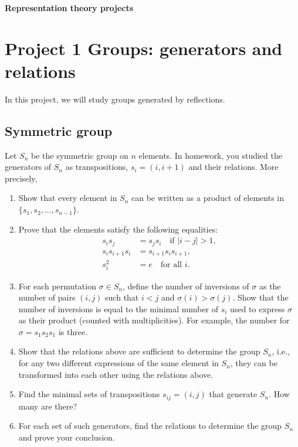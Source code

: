 \documentclass[12pt]{article}
\theoremstyle{definition}
\theoremstyle{remark}
\begin{document}
\centerline{\bf\large Representation theory projects}
\centerline{}








\section{Project 1 Groups: generators and relations}
In this project, we will study groups generated by reflections. 

\subsection{Symmetric group}
Let $S_n$ be the symmetric group on $n$ elements. In homework, you studied the generators of $S_n$ as transpositions, $s_i=(i,i+1)$ and their relations. More precisely, 
\begin{enumerate}
  \item Show that every element in $S_n$ can be written as a product of elements in $\{s_1, s_2, \ldots, s_{n-1}\}$.
  \item Prove that the elements satisfy the following equalities:
  \begin{align*}  
    s_i s_j &= s_j s_i \quad \text{if } |i - j| > 1, \\
    s_i s_{i+1} s_i&= s_{i+1} s_i s_{i+1}, \\
    s_i^2 &= e \quad \text{for all } i.
  \end{align*}

  \item For each permutation $\sigma\in S_n$, define the number of inversions of $\sigma$ as the number of pairs $(i,j)$ such that $i<j$ and $\sigma(i)>\sigma(j)$. Show that the number of inversions is equal to the minimal number of $s_i$ used to express $\sigma$ as their product (counted with multiplicities). For example, the number for $\sigma=s_1s_2s_1$ is three.

  \item Show that the relations above are sufficient to determine the group $S_n$, i.e., for any two different expressions of the same element in $S_n$, they can be transformed into each other using the relations above.
  
  \item Find the minimal sets of transpositions $s_{ij}=(i,j)$ that generate $S_n$. How many are there?
  \item For each set of such generators, find the relations to determine the group $S_n$ and prove your conclusion.
\end{enumerate}
\end{document}
